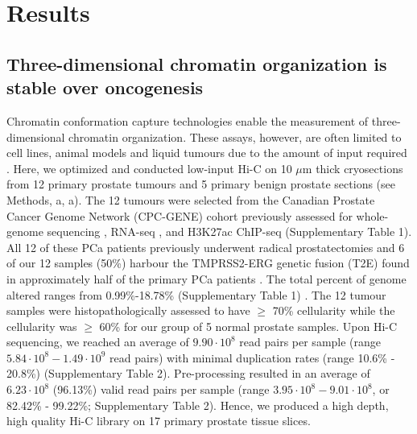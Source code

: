 \section{Results}

\subsection{Three-dimensional chromatin organization is stable over oncogenesis}

Chromatin conformation capture technologies enable the measurement of three-dimensional chromatin organization.
These assays, however, are often limited to cell lines, animal models and liquid tumours due to the amount of input required \cite{lieberman-aidenComprehensiveMappingLongRange2009}.
Here, we optimized and conducted low-input Hi-C \cite{diazChromatinConformationAnalysis2018} on 10 $\mu$m thick cryosections from 12 primary prostate tumours and 5 primary benign prostate sections (see Methods, a, a).
The 12 tumours were selected from the Canadian Prostate Cancer Genome Network (CPC-GENE) cohort previously assessed for whole-genome sequencing \cite{fraserGenomicHallmarksLocalized2017}, RNA-seq \cite{chenWidespreadFunctionalRNA2019}, and H3K27ac ChIP-seq \cite{kronTMPRSS2ERGFusion2017,mazrooeiCistromePartitioningReveals2019} (Supplementary Table 1).
All 12 of these PCa patients previously underwent radical prostatectomies and 6 of our 12 samples (50\%) harbour the TMPRSS2-ERG genetic fusion (T2E) found in approximately half of the primary PCa patients \cite{fraserGenomicHallmarksLocalized2017}.
The total percent of genome altered ranges from 0.99\%-18.78\% (Supplementary Table 1) \cite{fraserGenomicHallmarksLocalized2017}.
The 12 tumour samples were histopathologically assessed to have $\ge$ 70\% cellularity while the cellularity was $\ge$ 60\% for our group of 5 normal prostate samples.
Upon Hi-C sequencing, we reached an average of $9.90 \cdot 10^8$  read pairs per sample (range $5.84 \cdot 10^8 - 1.49 \cdot 10^9$ read pairs) with minimal duplication rates (range 10.6\% - 20.8\%) (Supplementary Table 2).
Pre-processing resulted in an average of $6.23 \cdot 10^8$ (96.13\%) valid read pairs per sample (range $3.95 \cdot 10^8 - 9.01 \cdot 10^8$, or 82.42\% - 99.22\%; Supplementary Table 2).
Hence, we produced a high depth, high quality Hi-C library on 17 primary prostate tissue slices.


